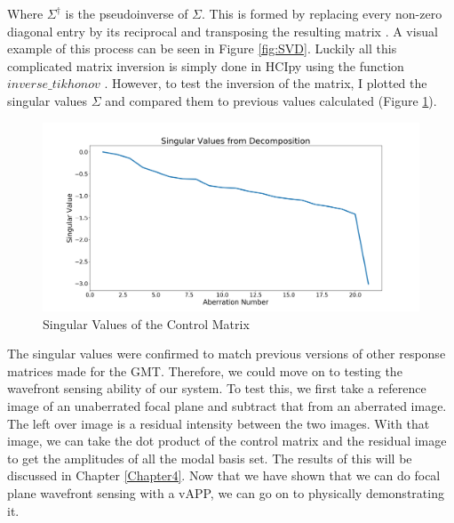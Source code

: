 Where $\Sigma^{\dagger}$ is the pseudoinverse of $\Sigma$.  This is formed by replacing every non-zero diagonal entry by
its reciprocal and transposing the resulting matrix \cite{Hestenes1958InversionResults}.  A visual example of this
process can be seen in Figure \ref{fig:SVD}. Luckily all this complicated matrix inversion is simply done in HCIpy using
the function $inverse\_tikhonov$ \cite{por2018hcipy}.  However, to test the inversion of the matrix, I plotted the
singular values $\Sigma$ and compared them to previous values calculated (Figure \ref{fig:SV}).




\begin{figure}[H]
    \centering
    \includegraphics[width = 14cm]{Figures/singular_values.png}
    \caption{Singular Values of the Control Matrix}
    \label{fig:SV}
\end{figure}


The singular values were confirmed to match previous versions of other response matrices made for the GMT.  Therefore, we could move on to testing the wavefront sensing ability of our system.  To test this, we first take a reference image of an unaberrated focal plane and subtract that from an aberrated image.  The left over image is a residual intensity between the two images.  With that image, we can take the dot product of the control matrix and the residual image to get the amplitudes of all the modal basis set.  The results of this will be discussed in Chapter \ref{Chapter4}.  Now that we have shown that we can do focal plane wavefront sensing with a vAPP, we can go on to physically demonstrating it.
